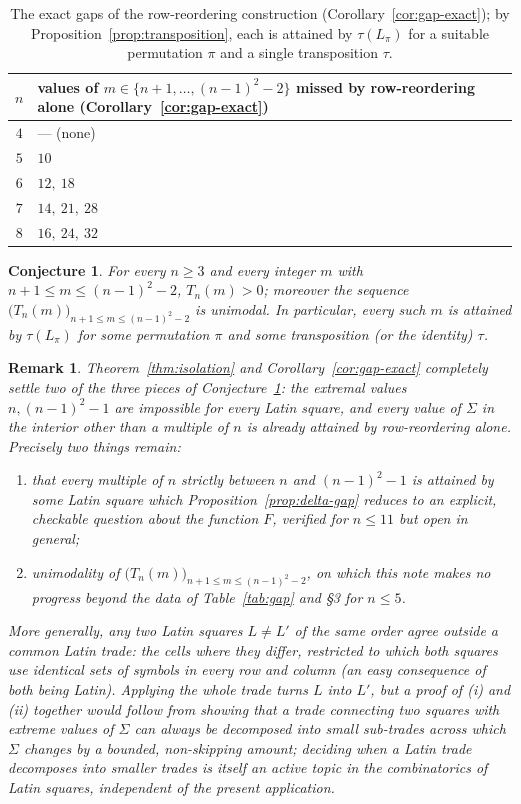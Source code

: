 \documentclass[11pt]{amsart}
\newtheorem{conjecture}[theorem]{Conjecture}
\newtheorem{remark}[theorem]{Remark}
\begin{document}
\begin{table}[h]
\centering
\begin{tabular}{@{}c|l@{}}
\toprule
$n$ & values of $m\in\{n+1,\dots,(n-1)^2-2\}$ missed by row-reordering alone (Corollary~\ref{cor:gap-exact}) \\
\midrule
$4$ & --- (none) \\
$5$ & $10$ \\
$6$ & $12,\ 18$ \\
$7$ & $14,\ 21,\ 28$ \\
$8$ & $16,\ 24,\ 32$ \\
\bottomrule
\end{tabular}
\caption{The exact gaps of the row-reordering construction (Corollary~\ref{cor:gap-exact}); by Proposition~\ref{prop:transposition}, each is attained by $\tau(L_\pi)$ for a suitable permutation $\pi$ and a single transposition $\tau$.}
\label{tab:reorder-gaps}
\end{table}

\begin{conjecture}\label{conj:interior}
For every $n\ge 3$ and every integer $m$ with $n+1\le m\le (n-1)^2-2$, $T_n(m)>0$; moreover the sequence $\bigl(T_n(m)\bigr)_{n+1\le m\le (n-1)^2-2}$ is unimodal. In particular, every such $m$ is attained by $\tau(L_\pi)$ for some permutation $\pi$ and some transposition (or the identity) $\tau$.
\end{conjecture}

\begin{remark}
Theorem~\ref{thm:isolation} and Corollary~\ref{cor:gap-exact} completely settle two of the three pieces of Conjecture~\ref{conj:interior}: the extremal values $n,(n-1)^2-1$ are impossible for every Latin square, and every value of $\Sigma$ in the interior \emph{other than a multiple of $n$} is already attained by row-reordering alone. Precisely two things remain:
\begin{enumerate}
\item[(i)] that every multiple of $n$ strictly between $n$ and $(n-1)^2-1$ is attained by \emph{some} Latin square which Proposition~\ref{prop:delta-gap} reduces to an explicit, checkable question about the function $F$, verified for $n\le 11$ but open in general;
\item[(ii)] unimodality of $\bigl(T_n(m)\bigr)_{n+1\le m\le(n-1)^2-2}$, on which this note makes no progress beyond the data of Table~\ref{tab:gap} and \S3 for $n\le5$.
\end{enumerate}
More generally, any two Latin squares $L\ne L'$ of the same order agree outside a common \emph{Latin trade}: the cells where they differ, restricted to which both squares use identical sets of symbols in every row and column (an easy consequence of both being Latin). Applying the whole trade turns $L$ into $L'$, but a proof of (i) and (ii) together would follow from showing that a trade connecting two squares with extreme values of $\Sigma$ can always be decomposed into small sub-trades across which $\Sigma$ changes by a bounded, non-skipping amount; deciding when a Latin trade decomposes into smaller trades is itself an active topic in the combinatorics of Latin squares, independent of the present application.
\end{remark}
\end{document}
